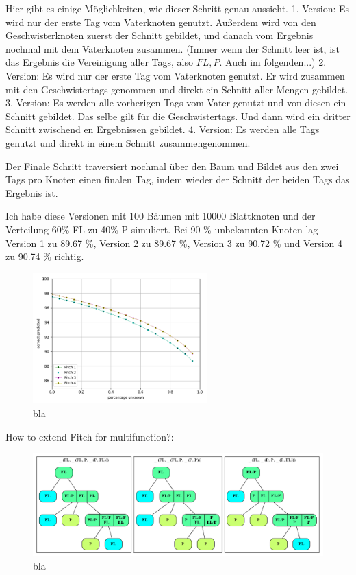         Hier gibt es einige Möglichkeiten, wie dieser Schritt genau aussieht.
        1. Version: Es wird nur der erste Tag vom Vaterknoten genutzt. Außerdem wird von den 
        Geschwisterknoten zuerst der Schnitt gebildet, und danach vom Ergebnis nochmal mit dem Vaterknoten zusammen.
        (Immer wenn der Schnitt leer ist, ist das Ergebnis die Vereinigung aller Tags, also ${FL,P}$. Auch im folgenden...)
        2. Version: Es wird nur der erste Tag vom Vaterknoten genutzt. Er wird zusammen mit den 
        Geschwistertags genommen und direkt ein Schnitt aller Mengen gebildet.
        3. Version: Es werden alle vorherigen Tags vom Vater genutzt und von diesen ein Schnitt gebildet.
        Das selbe gilt für die Geschwistertags. Und dann wird ein dritter Schnitt zwischend en Ergebnissen gebildet.
        4. Version: Es werden alle Tags genutzt und direkt in einem Schnitt zusammengenommen.

        Der Finale Schritt traversiert nochmal über den Baum und Bildet aus den zwei Tags pro Knoten einen finalen
        Tag, indem wieder der Schnitt der beiden Tags das Ergebnis ist.

        Ich habe diese Versionen mit 100 Bäumen mit 10000 Blattknoten und der Verteilung 60\% FL zu 40\% P simuliert.
        Bei 90 \% unbekannten Knoten lag Version 1 zu 89.67 \%, Version 2 zu 89.67 \%, Version 3 zu 
          90.72 \% und Version 4 zu 90.74 \% richtig.

        \begin{figure}
          \caption{bla}
          \centering
            \includegraphics[width=0.6\textwidth]{Figures/simulation_fitch_evaluation.png}
        \end{figure}

        How to extend Fitch for multifunction?:
        \begin{figure}
          \caption{bla}
          \centering
            \includegraphics[width=1\textwidth]{Figures/Fitch2.png}
        \end{figure}

